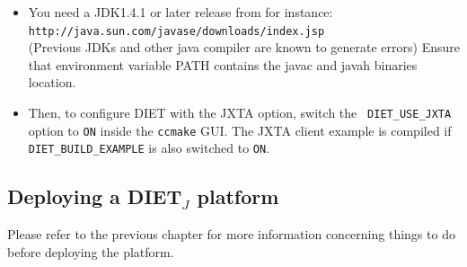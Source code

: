 \begin{itemize}
\item{You need a JDK1.4.1 or later release from for instance:\\
    \noindent
    {\footnotesize
      \texttt{http://java.sun.com/javase/downloads/index.jsp} }\\
      (Previous JDKs and other java compiler are known to generate
      errors) Ensure that environment variable PATH contains the javac
      and javah binaries location.}
  
\item{Then, to configure DIET with the JXTA option, switch the {\tt
    DIET\_USE\_JXTA} option to {\tt ON} inside the {\tt ccmake}
    GUI. The JXTA client example is compiled if {\tt
    DIET\_BUILD\_EXAMPLE} is also switched to {\tt ON}.}

\end{itemize}

\subsection {Deploying a DIET$_{J}$ platform}
\label{ssec:deployjxta}

Please refer to the previous chapter for more information concerning
things to do before deploying the platform.


